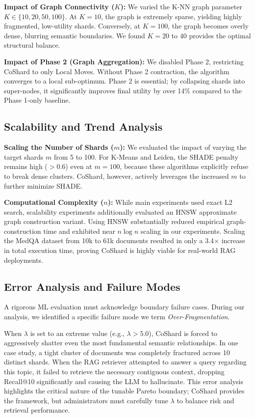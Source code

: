 \textbf{Impact of Graph Connectivity ($K$):} We varied the K-NN graph parameter $K \in \{10, 20, 50, 100\}$. At $K=10$, the graph is extremely sparse, yielding highly fragmented, low-utility shards. Conversely, at $K=100$, the graph becomes overly dense, blurring semantic boundaries. We found $K=20$ to $40$ provides the optimal structural balance.

\textbf{Impact of Phase 2 (Graph Aggregation):} We disabled Phase 2, restricting CoShard to only Local Moves. Without Phase 2 contraction, the algorithm converges to a local sub-optimum. Phase 2 is essential; by collapsing shards into super-nodes, it significantly improves final utility by over 14\% compared to the Phase 1-only baseline.

\subsection{Scalability and Trend Analysis}
\textbf{Scaling the Number of Shards ($m$):} We evaluated the impact of varying the target shards $m$ from 5 to 100. For K-Means and Leiden, the SHADE penalty remains high ($>0.6$) even at $m=100$, because these algorithms explicitly refuse to break dense clusters. CoShard, however, actively leverages the increased $m$ to further minimize SHADE.

\textbf{Computational Complexity ($n$):} While main experiments used exact L2 search, scalability experiments additionally evaluated an HNSW approximate graph construction variant. Using HNSW substantially reduced empirical graph-construction time and exhibited near $n \log n$ scaling in our experiments. Scaling the MedQA dataset from 10k to 61k documents resulted in only a 3.4$\times$ increase in total execution time, proving CoShard is highly viable for real-world RAG deployments.

\subsection{Error Analysis and Failure Modes}
A rigorous ML evaluation must acknowledge boundary failure cases. During our analysis, we identified a specific failure mode we term \textit{Over-Fragmentation}. 

When $\lambda$ is set to an extreme value (e.g., $\lambda > 5.0$), CoShard is forced to aggressively shatter even the most fundamental semantic relationships. In one case study, a tight cluster of documents was completely fractured across 10 distinct shards. When the RAG retriever attempted to answer a query regarding this topic, it failed to retrieve the necessary contiguous context, dropping Recall@10 significantly and causing the LLM to hallucinate. This error analysis highlights the critical nature of the tunable Pareto boundary; CoShard provides the framework, but administrators must carefully tune $\lambda$ to balance risk and retrieval performance.
